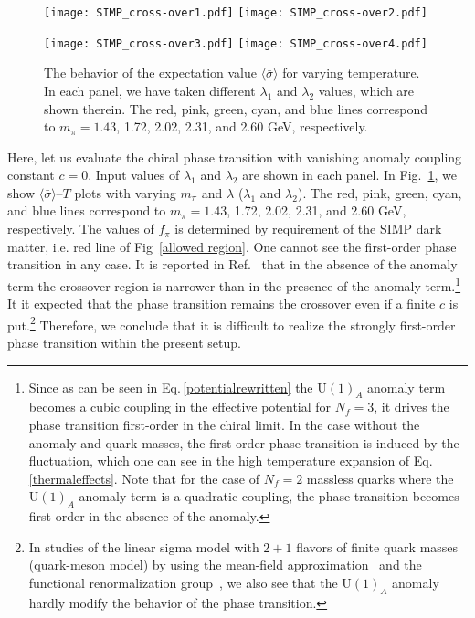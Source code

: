 \documentclass[a4paper,preprint,superscriptaddress,preprintnumbers,nofootinbib]{revtex4}
\newcommand{\fn}[1]{\!\left(#1\right)}
\newcommand{\bra}{\langle}
\newcommand{\ket}{\rangle}
\begin{document}
\begin{figure}
\begin{center}
\texttt{[image: SIMP\_cross-over1.pdf]}
\texttt{[image: SIMP\_cross-over2.pdf]}
\end{center}
\begin{center}
\texttt{[image: SIMP\_cross-over3.pdf]}
\texttt{[image: SIMP\_cross-over4.pdf]}
\end{center}
\vspace{-0.5cm}
\caption{The behavior of the expectation value $\bra \bar \sigma \ket$ for varying temperature.
In each panel, we have taken different $\lambda_1$ and $\lambda_2$ values,
 which are shown therein.
The red, pink, green, cyan, and blue lines correspond to $m_\pi = 1.43$, 1.72, 2.02, 2.31, and 2.60 GeV, respectively.
}
\label{SIMP_crossover}
\end{figure}
%
%
Here, let us evaluate the chiral phase transition with vanishing anomaly coupling constant $c=0$.
Input values of $\lambda_1$ and $\lambda_2$ are shown in each panel.
In Fig.~\ref{SIMP_crossover}, we show $\bra \bar \sigma\ket$--$T$ plots with varying $m_\pi$ and $\lambda$ ($\lambda_1$ and $\lambda_2$).
The red, pink, green, cyan, and blue lines correspond to $m_\pi = 1.43$, 1.72, 2.02, 2.31, and 2.60 GeV, respectively.
The values of $f_\pi$ is determined by requirement of the SIMP dark matter,
 i.e. red line of Fig~\ref{allowed region}.
One cannot see the first-order phase transition in any case.
It is reported in Ref.~\cite{Lenaghan:2000ey} that in the absence of the anomaly term the crossover region is narrower than in the presence of the anomaly term.\footnote{
Since as can be seen in Eq.\,\eqref{potentialrewritten} the $\text{U}\fn{1}_A$ anomaly term becomes a cubic coupling in the effective potential for $N_f=3$, it drives the phase transition first-order in the chiral limit.
In the case without the anomaly and quark masses, the first-order phase transition is induced by the fluctuation,  which one can see in the high temperature expansion of Eq.\,\eqref{thermaleffects}.
Note that for the case of $N_f=2$ massless quarks where the $\text{U}\fn{1}_A$ anomaly term is a quadratic coupling, the phase transition becomes first-order in the absence of the anomaly.
}
It it expected that the phase transition remains the crossover even if a finite $c$ is put.\footnote{
In studies of the linear sigma model with $2+1$ flavors of finite quark masses (quark-meson model) by using the mean-field approximation~\cite{Schaefer:2008hk} and the functional renormalization group~\cite{Mitter:2013fxa}, we also see that the $\text{U}\fn{1}_A$ anomaly hardly modify the behavior of the phase transition.
}
Therefore, we conclude that it is difficult to realize the strongly first-order phase transition within the present setup.
\end{document}

